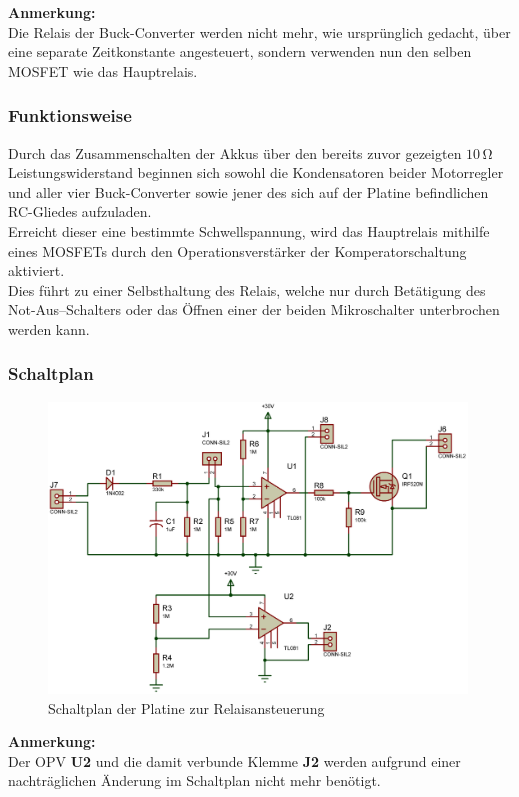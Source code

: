 \textbf{Anmerkung:}\\
Die Relais der Buck-Converter werden nicht mehr, wie ursprünglich gedacht, über eine separate Zeitkonstante angesteuert, sondern verwenden nun den selben MOSFET wie das Hauptrelais. 

\newpage
\subsubsection{Funktionsweise}
Durch das Zusammenschalten der Akkus über den bereits zuvor gezeigten $10\,\mathrm{\Omega}$ Leistungswiderstand beginnen sich sowohl die Kondensatoren beider Motorregler und aller vier Buck-Converter sowie jener des sich auf der Platine befindlichen RC-Gliedes aufzuladen.\\
Erreicht dieser eine bestimmte Schwellspannung, wird das Hauptrelais mithilfe eines MOSFETs durch den Operationsverstärker der Komperatorschaltung aktiviert.\\
Dies führt zu einer Selbsthaltung des Relais, welche nur durch Betätigung des Not-Aus--Schalters oder das Öffnen einer der beiden Mikroschalter unterbrochen werden kann.
\subsubsection{Schaltplan}
\begin{figure}[h]
    \centering
    \includegraphics[width=0.99\textwidth]{../Proteus/Exports/Relaisansteuerung.png}
    \caption{Schaltplan der Platine zur Relaisansteuerung\label{fig:plat:relais}}
\end{figure}
\textbf{Anmerkung:}\\
Der OPV \textbf{U2} und die damit verbunde Klemme \textbf{J2} werden aufgrund einer nachträglichen Änderung im Schaltplan nicht mehr benötigt.
\newpage
